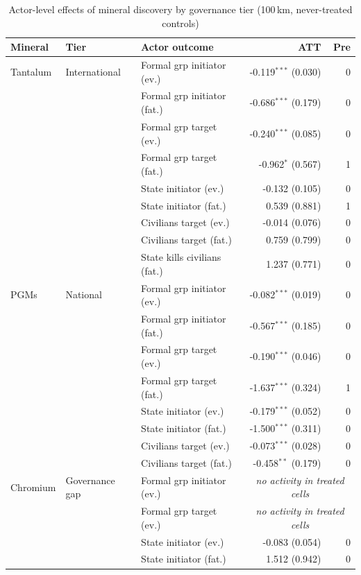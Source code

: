 \begin{table}[H]
\centering
\footnotesize
\caption{Actor-level effects of mineral discovery by governance tier (100\,km, never-treated controls)}
\label{tab:mech_combined}
\begin{tabular}{lllrr}
\toprule
\textbf{Mineral} & \textbf{Tier} & \textbf{Actor outcome} & \textbf{ATT} & \textbf{Pre} \\
\midrule
Tantalum & International & Formal grp initiator (ev.) & -0.119$^{***}$ (0.030) & 0 \\
 &  & Formal grp initiator (fat.) & -0.686$^{***}$ (0.179) & 0 \\
 &  & Formal grp target (ev.) & -0.240$^{***}$ (0.085) & 0 \\
 &  & Formal grp target (fat.) & -0.962$^{*}$ (0.567) & 1 \\
 &  & State initiator (ev.) & -0.132 (0.105) & 0 \\
 &  & State initiator (fat.) & 0.539 (0.881) & 1 \\
 &  & Civilians target (ev.) & -0.014 (0.076) & 0 \\
 &  & Civilians target (fat.) & 0.759 (0.799) & 0 \\
 &  & State kills civilians (fat.) & 1.237 (0.771) & 0 \\
\midrule
PGMs & National & Formal grp initiator (ev.) & -0.082$^{***}$ (0.019) & 0 \\
 &  & Formal grp initiator (fat.) & -0.567$^{***}$ (0.185) & 0 \\
 &  & Formal grp target (ev.) & -0.190$^{***}$ (0.046) & 0 \\
 &  & Formal grp target (fat.) & -1.637$^{***}$ (0.324) & 1 \\
 &  & State initiator (ev.) & -0.179$^{***}$ (0.052) & 0 \\
 &  & State initiator (fat.) & -1.500$^{***}$ (0.311) & 0 \\
 &  & Civilians target (ev.) & -0.073$^{***}$ (0.028) & 0 \\
 &  & Civilians target (fat.) & -0.458$^{**}$ (0.179) & 0 \\
\midrule
Chromium & Governance gap & Formal grp initiator (ev.) & \multicolumn{2}{c}{\textit{no activity in treated cells}} \\
 &  & Formal grp target (ev.) & \multicolumn{2}{c}{\textit{no activity in treated cells}} \\
 &  & State initiator (ev.) & -0.083 (0.054) & 0 \\
 &  & State initiator (fat.) & 1.512 (0.942) & 0 \\

\end{tabular}
\end{table}
